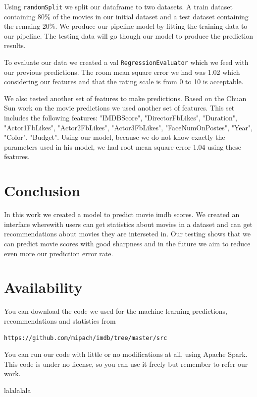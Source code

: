 \documentclass[letterpaper,twocolumn,10pt]{article}
\begin{document}
Using \texttt{randomSplit} we split our dataframe to two datasets. A train dataset containing 80\% of the movies in our initial dataset and a test dataset containing the remaing 20\%. We produce our pipeline model by fitting the training data to our pipeline. The testing data will go though our model to produce the prediction results.\par 

To evaluate our data we created a val \texttt{RegressionEvaluator} which we feed with our previous predictions. The room mean square error we had was 1.02 which considering our features and that the rating scale is from 0 to 10 is acceptable.

We also tested another set of features to make predictions. Based on the Chuan Sun work on the movie predictions we used another set of features. This set includes the following features: "IMDBScore", "DirectorFbLikes", "Duration", "Actor1FbLikes", "Actor2FbLikes", "Actor3FbLikes", "FaceNumOnPostes", "Year", "Color", "Budget". Using our model, because we do not know exactly the parameters used in his model, we had root mean square error 1.04 using these features.  
\section{Conclusion}

In this work we created a model to predict movie imdb scores. We created an interface wherewith users can get statistics about movies in a dataset and can get recommendations about movies they are interseted in. Our testing shows that we can predict movie scores with good sharpness and in the future we aim to reduce even more our prediction error rate.  

\section{Availability}

You can download the code we used for the machine learning predictions, recommendations and statistics from

\begin{center}
{\tt https://github.com/mipach/imdb/tree/master/src}\\
\end{center}

You can run our code with little or no modifications at all, using Apache Spark. This code is under no license, so you can use it freely but remember to refer our work.


{\footnotesize 
}
lalalalala
\end{document}
